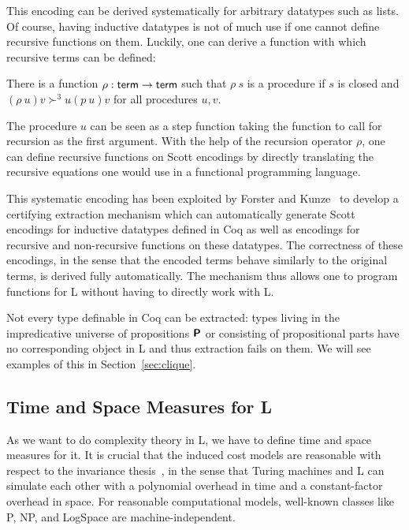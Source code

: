 This encoding can be derived systematically for arbitrary datatypes such as lists.
Of course, having inductive datatypes is not of much use if one cannot define recursive functions on them. 
Luckily, one can derive a function with which recursive terms can be defined: 
\begin{fact}
  There is a function $\rho : \textsf{term} \rightarrow \textsf{term}$ such that $\rho~s$ is a procedure if $s$ is closed and $(\rho~u)v \succ^3 u(p~u)v$ for all procedures $u, v$.
\end{fact}
The procedure $u$ can be seen as a step function taking the function to call for recursion as the first argument. 
With the help of the recursion operator $\rho$, one can define recursive functions on Scott encodings by directly translating the recursive equations one would use in a functional programming language.

This systematic encoding has been exploited by Forster and Kunze~\cite{ForsterKunze:2019:Certifying-extraction} to develop a certifying extraction mechanism which can automatically generate Scott encodings for inductive datatypes defined in Coq as well as encodings for recursive and non-recursive functions on these datatypes. The correctness of these encodings, in the sense that the encoded terms behave similarly to the original terms, is derived fully automatically.
The mechanism thus allows one to program functions for L without having to directly work with L.

\begin{remark}
  Not every type definable in Coq can be extracted: types living in the impredicative universe of propositions $\textsf{\bfseries P}$ or consisting of propositional parts have no corresponding object in L and thus extraction fails on them. 
  We will see examples of this in Section~\ref{sec:clique}. 
\end{remark}

\subsection{Time and Space Measures for L}\label{sec:time_and_space}
As we want to do complexity theory in L, we have to define time and space measures for it.
It is crucial that the induced cost models are reasonable with respect to the invariance thesis~\cite{slot_boas:invariance}, in the sense that Turing machines and L can simulate each other with a polynomial overhead in time and a constant-factor overhead in space. For reasonable computational models, well-known classes like \textsf{P}, \textsf{NP}, and \textsf{LogSpace} are machine-independent. 

